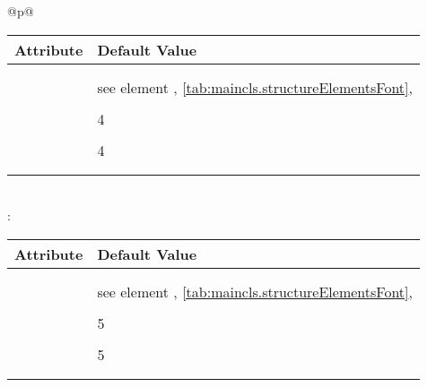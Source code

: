 \begin{longtable}{@{}p{\columnwidth}@{}}
    \begin{tabularx}{\linewidth}{ll}
    \toprule
    Attribute & Default Value \\
    \midrule\nopagebreak
    \PValue{afterskip}   & \PValue{-1em} \\
    \PValue{beforeskip}  & \PValue{3.25ex plus 1ex minus .2ex} \\
    \PValue{font}        & see element \FontElement{paragraph},
                           \autoref{tab:maincls.structureElementsFont}, 
                           \autopageref{tab:maincls.structureElementsFont} \\
    \PValue{indent}      & \PValue{0pt} \\
    \PValue{level}       & 4 \\
    \PValue{tocindent}   & \PValue{10em}\\
    \PValue{toclevel}    & 4 \\
    \PValue{tocnumwidth} & \PValue{5em}\\
    \PValue{tocstyle}    & \PValue{section} \\
    \bottomrule
    \end{tabularx} \\
    \addlinespace[\normalbaselineskip]
    :  \\*
    \begin{tabularx}{\linewidth}{ll}
    \toprule
    Attribute & Default Value \\
    \midrule\nopagebreak
    \PValue{afterskip}   & \PValue{-1em} \\
    \PValue{beforeskip}  & \PValue{3.25ex plus 1ex minus .2ex} \\
    \PValue{font}        & see element \FontElement{subparagraph},
                           \autoref{tab:maincls.structureElementsFont}, 
                           \autopageref{tab:maincls.structureElementsFont} \\
    \PValue{indent}      & \Macro{scr@parindent} \\
    \PValue{level}       & 5 \\
    \PValue{tocindent}   & \PValue{12em}\\
    \PValue{toclevel}    & 5 \\
    \PValue{tocnumwidth} & \PValue{6em}\\
    \PValue{tocstyle}    & \PValue{section} \\
    \bottomrule
    \end{tabularx}
  \end{longtable}
%
%
%
%
%


